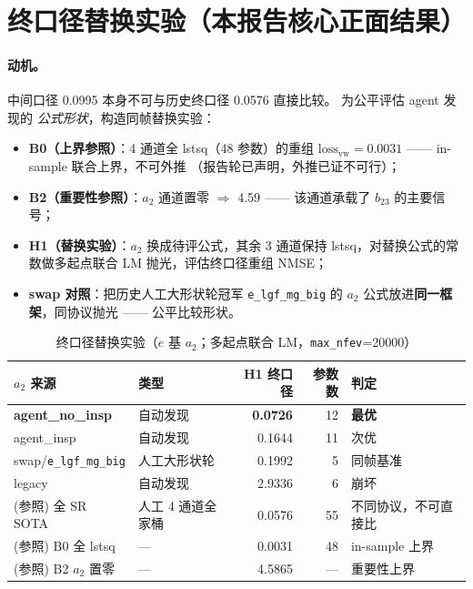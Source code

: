 \documentclass[11pt,a4paper]{ctexart}
\begin{document}
\section{终口径替换实验（本报告核心正面结果）}\label{sec:refit}

\paragraph{动机。}中间口径 0.0995 本身不可与历史终口径 0.0576 直接比较。
为公平评估 agent 发现的 \emph{公式形状}，构造同帧替换实验：

\begin{itemize}\itemsep2pt
  \item \textbf{B0（上界参照）}：4 通道全 lstsq（48 参数）的重组
        $\mathrm{loss_{vw}}=0.0031$ —— in-sample 联合上界，不可外推
        （报告轮已声明，外推已证不可行）；
  \item \textbf{B2（重要性参照）}：$a_2$ 通道置零 $\Rightarrow$ 4.59
        —— 该通道承载了 $b_{23}$ 的主要信号；
  \item \textbf{H1（替换实验）}：$a_2$ 换成待评公式，其余 3 通道保持
        lstsq，对替换公式的常数做多起点联合 LM 抛光，评估终口径重组 NMSE；
  \item \textbf{swap 对照}：把历史人工大形状轮冠军 \texttt{e\_lgf\_mg\_big}
        的 $a_2$ 公式放进\textbf{同一框架}，同协议抛光 —— 公平比较形状。
\end{itemize}

\begin{table}[htbp]\centering\small
\caption{终口径替换实验（$e$ 基 $a_2$；多起点联合 LM，\texttt{max\_nfev}=20000）}
\begin{tabular}{@{}llrrl@{}}
\toprule
$a_2$ 来源 & 类型 & H1 终口径 & 参数数 & 判定 \\
\midrule
\textbf{agent\_no\_insp} & 自动发现 & \textbf{0.0726} & 12 & \textbf{最优} \\
agent\_insp & 自动发现 & 0.1644 & 11 & 次优 \\
swap/\texttt{e\_lgf\_mg\_big} & 人工大形状轮 & 0.1992 & 5 & 同帧基准 \\
legacy & 自动发现 & 2.9336 & 6 & 崩坏 \\
\midrule
(参照) 全 SR SOTA & 人工 4 通道全家桶 & 0.0576 & 55 & 不同协议，不可直接比 \\
(参照) B0 全 lstsq & — & 0.0031 & 48 & in-sample 上界 \\
(参照) B2 $a_2$ 置零 & — & 4.5865 & — & 重要性上界 \\
\bottomrule
\end{tabular}
\end{table}
\end{document}
